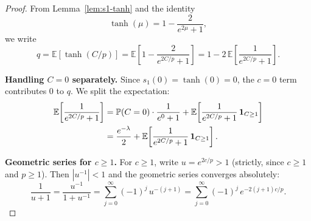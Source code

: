 \documentclass[11pt,a4paper]{article}
\newcommand{\E}{\mathbb{E}}
\newcommand{\Prob}{\mathbb{P}}
\begin{document}
\begin{proof}
From Lemma~\ref{lem:s1-tanh} and the identity
\begin{equation}\label{eq:tanh-identity}
  \tanh(\mu) = 1 - \frac{2}{e^{2\mu} + 1},
\end{equation}
we write
\begin{equation}\label{eq:q-split}
  q = \E[\tanh(C/p)]
    = \E\!\left[1 - \frac{2}{e^{2C/p} + 1}\right]
    = 1 - 2\,\E\!\left[\frac{1}{e^{2C/p} + 1}\right].
\end{equation}

\medskip\noindent\textbf{Handling $C = 0$ separately.}
Since $s_1(0) = \tanh(0) = 0$, the $c = 0$ term contributes $0$ to $q$.
We split the expectation:
\begin{align}
  \E\!\left[\frac{1}{e^{2C/p} + 1}\right]
  &= \Prob(C = 0) \cdot \frac{1}{e^{0} + 1}
     + \E\!\left[\frac{1}{e^{2C/p} + 1}\,\mathbf{1}_{C \ge 1}\right]
     \notag \\
  &= \frac{e^{-\lambda}}{2}
     + \E\!\left[\frac{1}{e^{2C/p} + 1}\,\mathbf{1}_{C \ge 1}\right].
  \label{eq:split-c0}
\end{align}

\medskip\noindent\textbf{Geometric series for $c \ge 1$.}
For $c \ge 1$, write $u = e^{2c/p} > 1$ (strictly, since $c \ge 1$ and
$p \ge 1$).  Then $|u^{-1}| < 1$ and the geometric series converges
absolutely:
\begin{equation}\label{eq:geometric}
  \frac{1}{u + 1}
  = \frac{u^{-1}}{1 + u^{-1}}
  = \sum_{j=0}^{\infty} (-1)^j\, u^{-(j+1)}
  = \sum_{j=0}^{\infty} (-1)^j\, e^{-2(j+1)c/p}.
\end{equation}


\end{proof}
\end{document}
